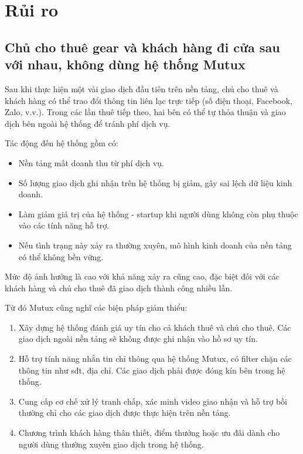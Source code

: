 \section{Rủi ro}

\subsection{Chủ cho thuê gear và khách hàng đi cửa sau với nhau, không dùng hệ thống Mutux}

Sau khi thực hiện một vài giao dịch đầu tiên trên nền tảng, chủ cho thuê và khách hàng có thể trao đổi thông tin liên lạc trực tiếp (số điện thoại, Facebook, Zalo, v.v.). Trong các lần thuê tiếp theo, hai bên có thể tự thỏa thuận và giao dịch bên ngoài hệ thống để tránh phí dịch vụ.

Tác động đến hệ thống gồm có:
\begin{itemize}
    \item Nền tảng mất doanh thu từ phí dịch vụ.
    \item Số lượng giao dịch ghi nhận trên hệ thống bị giảm, gây sai lệch dữ liệu kinh doanh.
    \item Làm giảm giá trị của hệ thống - startup khi người dùng không còn phụ thuộc vào các tính năng hỗ trợ.
    \item Nếu tình trạng này xảy ra thường xuyên, mô hình kinh doanh của nền tảng có thể không bền vững.
\end{itemize}

Mức độ ảnh hưởng là cao với khả năng xảy ra cũng cao, đặc biệt đối với các khách hàng và chủ cho thuê đã giao dịch thành công nhiều lần.

Từ đó Mutux cũng nghĩ các biện pháp giảm thiểu: 

\begin{enumerate}
    \item Xây dựng hệ thống đánh giá uy tín cho cả khách thuê và chủ cho thuê. Các giao dịch ngoài nền tảng sẽ không được ghi nhận vào hồ sơ uy tín.
    \item Hỗ trợ tính năng nhắn tin chỉ thông qua hệ thống Mutux, có filter chặn các thông tin như sđt, địa chỉ. Các giao dịch phải được đóng kín bên trong hệ thống.
    \item Cung cấp cơ chế xử lý tranh chấp, xác minh video giao nhận và hỗ trợ bồi thường chỉ cho các giao dịch được thực hiện trên nền tảng.
    \item Chương trình khách hàng thân thiết, điểm thưởng hoặc ưu đãi dành cho người dùng thường xuyên giao dịch trong hệ thống.
\end{enumerate}

